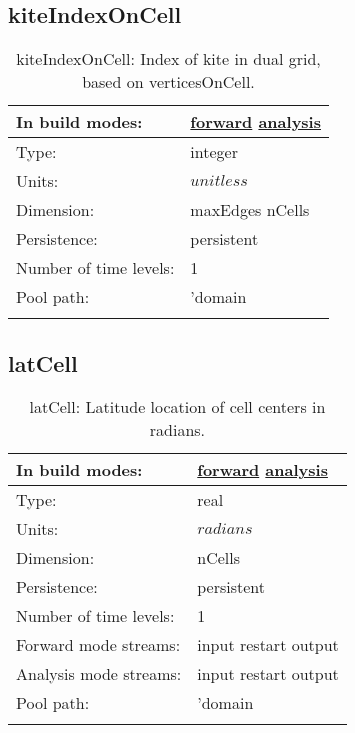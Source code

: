 \subsection[kiteIndexOnCell]{kiteIndexOnCell}
\label{subsec:var_sec_mesh_kiteIndexOnCell}
\begin{center}
\begin{longtable}{| p{2.0in} | p{4.0in} |}
        \hline 
        In build modes: & \hyperref[subsec:forward_var_tab_mesh]{forward} \hyperref[subsec:analysis_var_tab_mesh]{analysis} \\
        \hline 
        Type: & integer \\
        \hline 
        Units: & $unitless$ \\
        \hline 
        Dimension: & maxEdges nCells \\
        \hline 
        Persistence: & persistent \\
        \hline 
        Number of time levels: & 1 \\
        \hline 
            Pool path: & 'domain %
 \\
		 \hline 
    \caption{kiteIndexOnCell: Index of kite in dual grid, based on verticesOnCell.}
\end{longtable}
\end{center}
\subsection[latCell]{latCell}
\label{subsec:var_sec_mesh_latCell}
\begin{center}
\begin{longtable}{| p{2.0in} | p{4.0in} |}
        \hline 
        In build modes: & \hyperref[subsec:forward_var_tab_mesh]{forward} \hyperref[subsec:analysis_var_tab_mesh]{analysis} \\
        \hline 
        Type: & real \\
        \hline 
        Units: & $radians$ \\
        \hline 
        Dimension: & nCells \\
        \hline 
        Persistence: & persistent \\
        \hline 
        Number of time levels: & 1 \\
        \hline 
		 Forward mode streams: &  input restart output \\
        \hline 
		 Analysis mode streams: &  input restart output \\
        \hline 
            Pool path: & 'domain %
 \\
		 \hline 
    \caption{latCell: Latitude location of cell centers in radians.}
\end{longtable}
\end{center}
